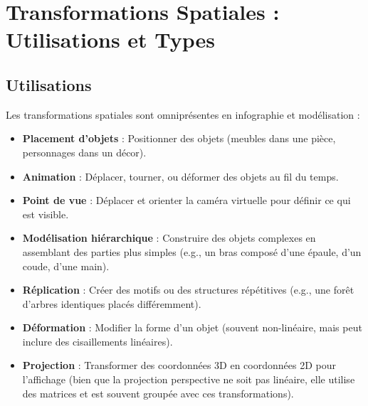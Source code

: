 \section{Transformations Spatiales : Utilisations et Types}
\subsection{Utilisations}
Les transformations spatiales sont omniprésentes en infographie et modélisation :
\begin{itemize}
    \item \textbf{Placement d'objets} : Positionner des objets (meubles dans une pièce, personnages dans un décor).
    \item \textbf{Animation} : Déplacer, tourner, ou déformer des objets au fil du temps.
    \item \textbf{Point de vue} : Déplacer et orienter la caméra virtuelle pour définir ce qui est visible.
    \item \textbf{Modélisation hiérarchique} : Construire des objets complexes en assemblant des parties plus simples (e.g., un bras composé d'une épaule, d'un coude, d'une main).
    \item \textbf{Réplication} : Créer des motifs ou des structures répétitives (e.g., une forêt d'arbres identiques placés différemment).
    \item \textbf{Déformation} : Modifier la forme d'un objet (souvent non-linéaire, mais peut inclure des cisaillements linéaires).
    \item \textbf{Projection} : Transformer des coordonnées 3D en coordonnées 2D pour l'affichage (bien que la projection perspective ne soit pas linéaire, elle utilise des matrices et est souvent groupée avec ces transformations).
\end{itemize}
